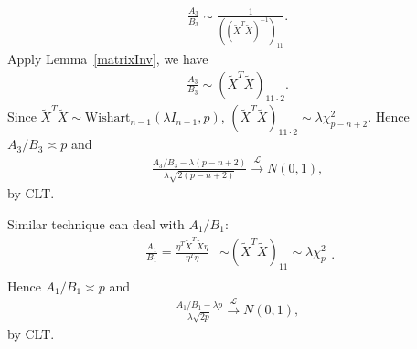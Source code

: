\documentclass[review]{elsarticle}
\theoremstyle{plain}
\theoremstyle{definition}
\theoremstyle{remark}
\begin{document}
\begin{equation}
    \begin{aligned}
        \frac{A_3}{B_3}\sim 
        \frac{1}{{({(\tilde{X}^T\tilde{X})}^{-1})}_{11}}.
    \end{aligned}
\end{equation}
Apply Lemma~\ref{matrixInv}, we have 
\begin{equation}
    \begin{aligned}
        \frac{A_3}{B_3}\sim 
        {(\tilde{X}^T\tilde{X})}_{11\cdot 2}.
    \end{aligned}
\end{equation}
Since $\tilde{X}^T \tilde{X}\sim \textrm{Wishart}_{n-1}(\lambda I_{n-1},p)$, ${(\tilde{X}^T\tilde{X})}_{11\cdot 2}\sim \lambda \chi^2_{p-n+2}$. Hence $A_3/B_3\asymp p$ and
\begin{equation}
    \begin{aligned}
        \frac{A_3/B_3-\lambda (p-n+2)}{\lambda\sqrt{2(p-n+2)}
        }\xrightarrow{\mathcal{L}}N(0,1),
    \end{aligned}
\end{equation}
by CLT.\

Similar technique can deal with $A_1/B_1$:
\begin{equation}
    \begin{aligned}
        \frac{A_1}{B_1}=\frac{\eta^T \tilde{X}^T\tilde{X} \eta    
        }{\eta^T\eta}&\sim {(\tilde{X}^T\tilde{X})}_{11}\sim \lambda \chi^2_{p}
\\
    \end{aligned}.
\end{equation}
Hence $A_1/B_1\asymp p$ and 
\begin{equation}
    \begin{aligned}
        \frac{A_1/B_1
    -\lambda p}{\lambda\sqrt{2p}
        }\xrightarrow{\mathcal{L}}N(0,1),
    \end{aligned}
\end{equation}
by CLT.\@
\end{document}
